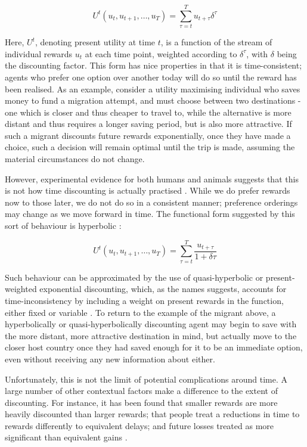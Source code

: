 \documentclass{article}
\begin{document}
\[
U^{t}(u_t, u_{t+1},\dots,u_T ) = \sum_{\tau=t}^{T} u_{t+\tau}\delta^{\tau}
\]

Here, \(U^t\), denoting present utility at time \(t\), is a function of the stream of individual rewards \(u_t\) at each time point, weighted  according to \(\delta^{\tau}\), with \(\delta\) being the discounting factor. This form has nice properties in that it is time-consistent; agents who prefer one option over another today will do so until the reward has been realised. As an example, consider a utility maximising individual who saves money to fund a migration attempt, and must choose between two destinations - one which is closer and thus cheaper to travel to, while the alternative is more distant and thus requires a longer saving period, but is also more attractive. If such a migrant discounts future rewards exponentially, once they have made a choice, such a decision will remain optimal until the trip is made, assuming the material circumstances do not change.


However, experimental evidence for both humans and animals suggests that this is not how time discounting is actually practised \citep{Boyer2008}. While we do prefer rewards now to those later, we do not do so in a consistent manner; preference orderings may change as we move forward in time. The functional form suggested by this sort of behaviour is hyperbolic \citep{Benhabib2010}:

\[
U^{t}(u_t, u_{t+1},\dots,u_T ) = \sum_{\tau=t}^{T} \frac{ u_{t+\tau}}{1+\delta\tau}
\]


Such behaviour can be approximated by the use of quasi-hyperbolic or present-weighted exponential discounting, which, as the names suggests, accounts for time-inconsistency by including a weight on present rewards in the function, either fixed or variable \citep{Benhabib2010}. To return to the example of the migrant above, a hyperbolically or quasi-hyperbolically discounting agent may begin to save with the more distant, more attractive destination in mind, but actually move to the closer host country once they had saved enough for it to be an immediate option, even without receiving any new information about either.

Unfortunately, this is not the limit of potential complications around time. A large number of other contextual factors make a difference to the extent of discounting. For instance, it has been found that smaller rewards are more heavily discounted than larger rewards; that people treat a reductions in time to rewards differently to equivalent delays; and future losses treated as more significant than equivalent gains \citep{Read2000}.
\end{document}
